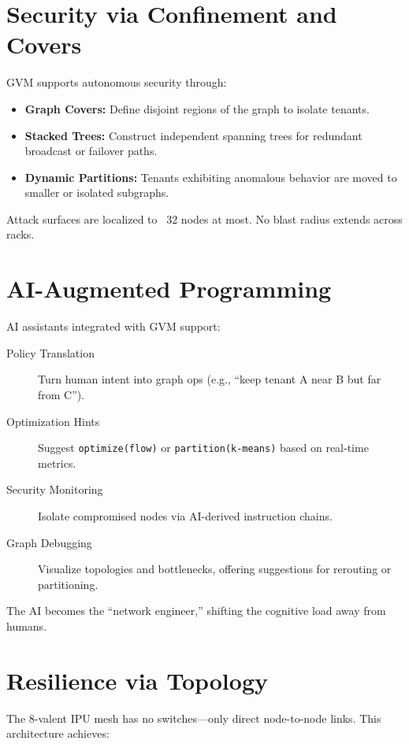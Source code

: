 \documentclass[../../../OAE-SPEC-MAIN.tex]{subfiles}
\begin{document}
\section{Security via Confinement and Covers}

GVM supports autonomous security through:

\begin{itemize}
  \item \textbf{Graph Covers:} Define disjoint regions of the graph to isolate tenants.
  \item \textbf{Stacked Trees:} Construct independent spanning trees for redundant broadcast or failover paths.
  \item \textbf{Dynamic Partitions:} Tenants exhibiting anomalous behavior are moved to smaller or isolated subgraphs.
\end{itemize}

Attack surfaces are localized to ~32 nodes at most. No blast radius extends across racks.

\section{AI-Augmented Programming}

AI assistants integrated with GVM support:

\begin{description}
  \item[Policy Translation] Turn human intent into graph ops (e.g., “keep tenant A near B but far from C”).
  \item[Optimization Hints] Suggest \texttt{optimize(flow)} or \texttt{partition(k-means)} based on real-time metrics.
  \item[Security Monitoring] Isolate compromised nodes via AI-derived instruction chains.
  \item[Graph Debugging] Visualize topologies and bottlenecks, offering suggestions for rerouting or partitioning.
\end{description}

The AI becomes the “network engineer,” shifting the cognitive load away from humans.

\section{Resilience via Topology}

The 8-valent IPU mesh has no switches—only direct node-to-node links. This architecture achieves:
\end{document}
